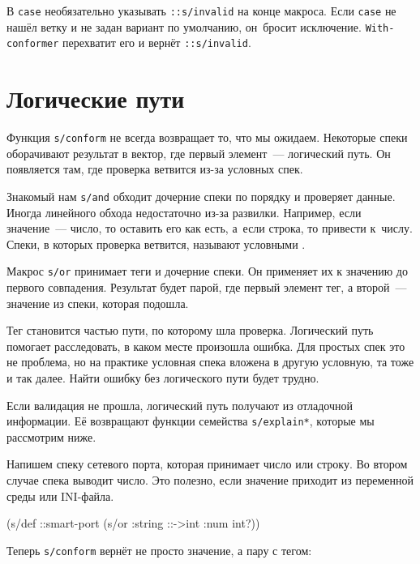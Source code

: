 В \verb|case| необязательно указывать \verb|::s/invalid| на конце
макроса. Если \verb|case| не нашёл ветку и не задан вариант по умолчанию,
он~бросит исключение. \verb|With-conformer| перехватит его и вернёт
\verb|::s/invalid|.

\section{Логические пути}


Функция \verb|s/conform| не всегда возвращает то, что мы ожидаем. Некоторые
спеки оборачивают результат в вектор, где первый элемент~--- логический путь. Он
появляется там, где проверка ветвится из-за условных спек.

Знакомый нам \verb|s/and| обходит дочерние спеки по порядку и проверяет
данные. Иногда линейного обхода недостаточно из-за развилки. Например, если
значение~--- число, то оставить его как есть, а~если строка, то привести
к~числу. Спеки, в которых проверка ветвится, называют условными
.

Макрос \verb|s/or| принимает теги и дочерние спеки. Он применяет их к значению
до первого совпадения. Результат будет парой, где первый элемент тег, а
второй~--- значение из спеки, которая подошла.

Тег становится частью пути, по которому шла проверка. Логический путь помогает
расследовать, в каком месте произошла ошибка. Для простых спек это не проблема,
но на практике условная спека вложена в другую условную, та тоже и так
далее. Найти ошибку без логического пути будет трудно.


Если валидация не прошла, логический путь получают из отладочной информации. Её
возвращают функции семейства \verb|s/explain*|, которые мы рассмотрим ниже.

Напишем спеку сетевого порта, которая принимает число или строку. Во втором
случае спека выводит число. Это полезно, если значение приходит из переменной
среды или INI-файла.

\begin{english}
  \begin{clojure}
(s/def ::smart-port
  (s/or :string ::->int :num int?))
  \end{clojure}
\end{english}

\noindent
Теперь \verb|s/conform| вернёт не просто значение, а пару с тегом:

